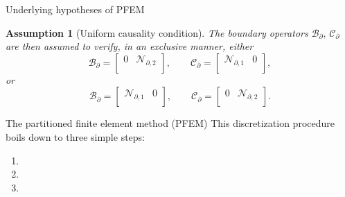 \documentclass[aspectratio=169]{ISAE-Beamer}
\newtheorem{assumption}{Assumption}
\begin{document}
\begin{frame}{Underlying hypotheses of PFEM}
{\begin{assumption}[Uniform causality condition]
The boundary operators $\mathcal{B}_\partial, \, \mathcal{C}_\partial$ are then assumed to verify, in an exclusive manner, either
\begin{equation*}
\mathcal{B}_\partial = \begin{bmatrix}
0 & \mathcal{N}_{\partial, 2} \\
\end{bmatrix}, \qquad 
\mathcal{C}_\partial = \begin{bmatrix}
\mathcal{N}_{\partial, 1} & 0 \\
\end{bmatrix},
\end{equation*}
or 
\begin{equation*}
\mathcal{B}_\partial = \begin{bmatrix}
\mathcal{N}_{\partial, 1} & 0 \\
\end{bmatrix}, \qquad \mathcal{C}_\partial = \begin{bmatrix}
0 & \mathcal{N}_{\partial, 2} \\
\end{bmatrix}.
\end{equation*}
\end{assumption}
}

\end{frame}

\begin{frame}{The partitioned finite element method (PFEM)}
This discretization procedure boils down to three simple steps:
\begin{enumerate}
	\item {} 
	\item {}
	\item {}
\end{enumerate}
\end{frame}
\end{document}
